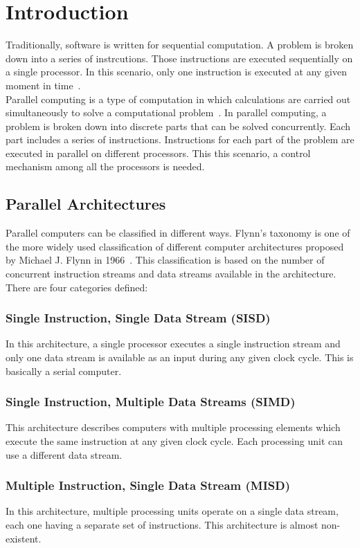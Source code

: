 \chapter{Introduction}
\label{sec:Introduction}

Traditionally, software is written for sequential computation. A problem is broken down into a series of instrcutions. Those instructions are executed sequentially on a single processor. In this scenario, only one instruction is executed at any given moment in time~\cite{barney2010introduction}.\\
Parallel computing is a type of computation in which calculations are carried out simultaneously to solve a computational problem~\cite{Almasi:1989:HPC:160438}. In parallel computing, a problem is broken down into discrete parts that can be solved concurrently. Each part includes a series of instructions. Instructions for each part of the problem are executed in parallel on different processors. This this scenario, a control mechanism among all the processors is needed.


\section{Parallel Architectures}
Parallel computers can be classified in different ways. Flynn's taxonomy is one of the more widely used classification of different computer architectures proposed by Michael J. Flynn in 1966~\cite{5009071,44900}. This classification is based on the number of concurrent instruction streams and data streams available in the architecture.
There are four categories defined:

\subsection{Single Instruction, Single Data Stream (SISD)}
    In this architecture, a single processor executes a single instruction stream and only one data stream is available as an input during any given clock cycle. This is basically a serial computer.
\subsection{Single Instruction, Multiple Data Streams (SIMD)}
    This architecture describes computers with multiple processing elements which execute the same instruction at any given clock cycle. Each processing unit can use a different data stream.
\subsection{Multiple Instruction, Single Data Stream (MISD)}
    In this architecture, multiple processing units operate on a single data stream, each one having a separate set of instructions. This architecture is almost non-existent.
